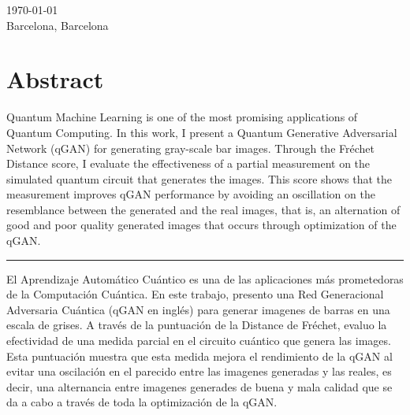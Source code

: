 \documentclass[a4paper,12pt,arial,numbered,print,index,oneside]{book}
\newcommand\blankpage{%
	\null
	\thispagestyle{empty}%
	\addtocounter{page}{-1}%
	\newpage}
\begin{document}
\begin{titlepage}
\begin{center}
\begin{singlespace}
		\vspace{.3cm}
		
		
		{\large \today} \\
		\large Barcelona, Barcelona  
		
		
		\vfill %
		\end{singlespace}
		\end{center}
		
	\end{titlepage}
	
	
	\afterpage{\blankpage}
	\begin{onehalfspacing}
		\tableofcontents
	\end{onehalfspacing}
	
	\clearpage
	
	\thispagestyle{plain}
	
	\section*{Abstract}
	Quantum Machine Learning is one of the most promising applications of Quantum Computing. In this work, I present a Quantum Generative Adversarial Network (qGAN) for generating gray-scale bar images. Through the Fréchet Distance score, I evaluate the effectiveness of a partial measurement on the simulated quantum circuit that generates the images. This score shows that the measurement improves qGAN performance by avoiding an oscillation on the resemblance between the generated and the real images, that is, an alternation of good and poor quality generated images that occurs through optimization of the qGAN. 
	
	\vspace{1cm}
	\hrule
	\vspace{1cm}

	El Aprendizaje Automático Cuántico es una de las aplicaciones más prometedoras de la Computación Cuántica. En este trabajo, presento una Red Generacional Adversaria Cuántica (qGAN en inglés) para generar imagenes de barras en una escala de grises. A través de la puntuación de la Distance de Fréchet, evaluo la efectividad de una medida parcial en el circuito cuántico que genera las images. Esta puntuación muestra que esta medida mejora el rendimiento de la qGAN al evitar una oscilación en el parecido entre las imagenes generadas y las reales, es decir, una alternancia entre imagenes generades de buena y mala calidad que se da a cabo a través de toda la optimización de la qGAN.
	\clearpage
	
\end{document}
